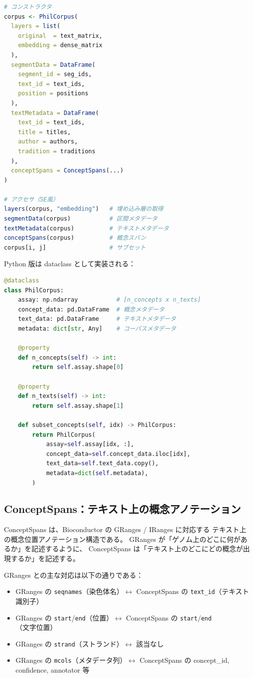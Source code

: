 \documentclass[a4paper,11pt]{ltjsarticle}
\begin{document}
\begin{lstlisting}[language=R,caption=PhilCorpus の R版操作例]
# コンストラクタ
corpus <- PhilCorpus(
  layers = list(
    original  = text_matrix,
    embedding = dense_matrix
  ),
  segmentData = DataFrame(
    segment_id = seg_ids,
    text_id = text_ids,
    position = positions
  ),
  textMetadata = DataFrame(
    text_id = text_ids,
    title = titles,
    author = authors,
    tradition = traditions
  ),
  conceptSpans = ConceptSpans(...)
)

# アクセサ（SE風）
layers(corpus, "embedding")   # 埋め込み層の取得
segmentData(corpus)           # 区間メタデータ
textMetadata(corpus)          # テキストメタデータ
conceptSpans(corpus)          # 概念スパン
corpus[i, j]                  # サブセット
\end{lstlisting}

Python 版は dataclass として実装される：

\begin{lstlisting}[language=Python,caption=PhilCorpus の Python版]
@dataclass
class PhilCorpus:
    assay: np.ndarray           # [n_concepts x n_texts]
    concept_data: pd.DataFrame  # 概念メタデータ
    text_data: pd.DataFrame     # テキストメタデータ
    metadata: dict[str, Any]    # コーパスメタデータ

    @property
    def n_concepts(self) -> int:
        return self.assay.shape[0]

    @property
    def n_texts(self) -> int:
        return self.assay.shape[1]

    def subset_concepts(self, idx) -> PhilCorpus:
        return PhilCorpus(
            assay=self.assay[idx, :],
            concept_data=self.concept_data.iloc[idx],
            text_data=self.text_data.copy(),
            metadata=dict(self.metadata),
        )
\end{lstlisting}

\subsection{ConceptSpans：テキスト上の概念アノテーション}

ConceptSpans は、Bioconductor の GRanges / IRanges に対応する
テキスト上の概念位置アノテーション構造である。
GRanges が「ゲノム上のどこに何があるか」を記述するように、
ConceptSpans は「テキスト上のどこにどの概念が出現するか」を記述する。

GRanges との主な対応は以下の通りである：

\begin{itemize}[leftmargin=2em]
  \item GRanges の \texttt{seqnames}（染色体名）$\leftrightarrow$ ConceptSpans の \texttt{text\_id}（テキスト識別子）
  \item GRanges の \texttt{start}/\texttt{end}（位置）$\leftrightarrow$ ConceptSpans の \texttt{start}/\texttt{end}（文字位置）
  \item GRanges の \texttt{strand}（ストランド）$\leftrightarrow$ 該当なし
  \item GRanges の \texttt{mcols}（メタデータ列）$\leftrightarrow$ ConceptSpans の concept\_id, confidence, annotator 等
\end{itemize}
\end{document}
